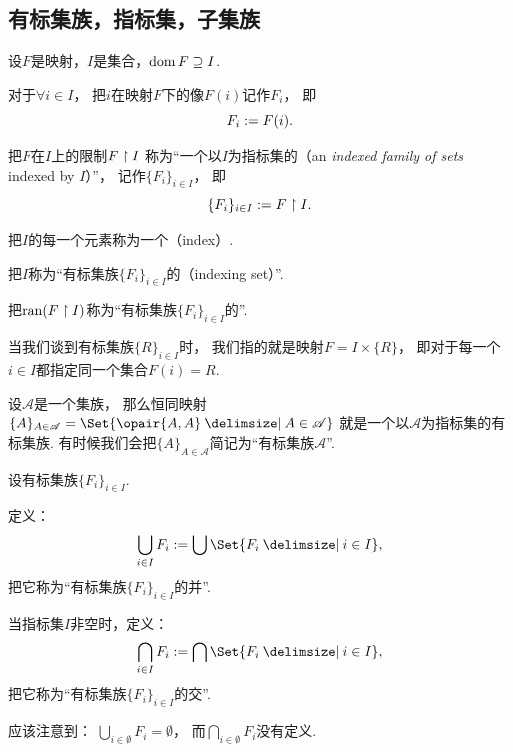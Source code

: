\subsection{有标集族，指标集，子集族}\label{section:集合论.指标集}
\begin{definition}
设\(F\)是映射，\(I\)是集合，\(\operatorname{dom} F \supseteq I\).

对于\(\forall i \in I\)，
把\(i\)在映射\(F\)下的像\(F(i)\)记作\(F_i\)，
即\begin{equation*}
	F_i := F(i).
\end{equation*}

把\(F\)在\(I\)上的限制\(F \upharpoonright I\)
称为“一个以\(I\)为指标集的（an \emph{indexed family of sets} indexed by \(I\)）”，
记作\(\{F_i\}_{i \in I}\)，
即\begin{equation*}
	\{F_i\}_{i\in I}
	:=
	F \upharpoonright I.
\end{equation*}

把\(I\)的每一个元素称为一个（index）.

把\(I\)称为“有标集族\(\{F_i\}_{i \in I}\)的（indexing set）”.

把\(\operatorname{ran}(F \upharpoonright I)\)称为“有标集族\(\{F_i\}_{i \in I}\)的”.
\end{definition}

\begin{example}
当我们谈到有标集族\(\{R\}_{i \in I}\)时，
我们指的就是映射\(F = I \times \{R\}\)，
即对于每一个\(i \in I\)都指定同一个集合\(F(i) = R\).
\end{example}

\begin{example}
设\(\mathscr{A}\)是一个集族，
那么恒同映射\(\{A\}_{A \in \mathscr{A}} = \Set{ \opair{A,A} \given A \in \mathscr{A} }\)
就是一个以\(\mathscr{A}\)为指标集的有标集族.
有时候我们会把\(\{A\}_{A \in \mathscr{A}}\)简记为“有标集族\(\mathscr{A}\)”.
\end{example}

\begin{definition}
设有标集族\(\{F_i\}_{i \in I}\).

定义：\begin{equation}
	\bigcup_{i \in I} F_i
	\defeq
	\bigcup\Set{ F_i \given i \in I },
\end{equation}
把它称为“有标集族\(\{F_i\}_{i \in I}\)的并”.

当指标集\(I\)非空时，定义：
\begin{equation}
	\bigcap_{i \in I} F_i
	\defeq
	\bigcap\Set{ F_i \given i \in I },
\end{equation}
把它称为“有标集族\(\{F_i\}_{i \in I}\)的交”.
\end{definition}
应该注意到：
\(\bigcup_{i \in \emptyset} F_i = \emptyset\)，
而\(\bigcap_{i \in \emptyset} F_i\)没有定义.

